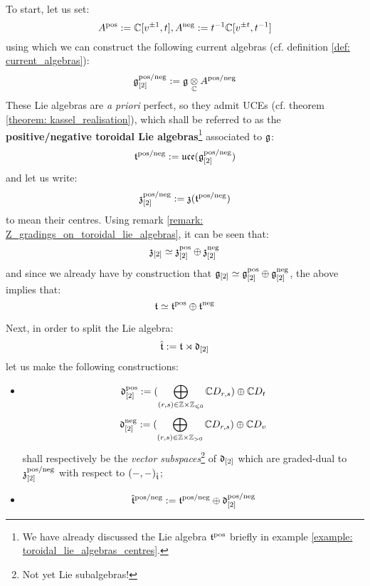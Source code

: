         To start, let us set:
            $$A^{\mathrm{pos}} := \mathbb{C}[v^{\pm 1}, t], A^{\mathrm{neg}} := t^{-1} \mathbb{C}[v^{\pm t}, t^{-1}]$$
        using which we can construct the following current algebras (cf. definition \ref{def: current_algebras}):
            $$\g_{[2]}^{\positive/\negative} := \g \tensor_{\bbC} A^{\positive/\negative}$$
        These Lie algebras are \textit{a priori} perfect, so they admit UCEs (cf. theorem \ref{theorem: kassel_realisation}), which shall be referred to as the \textbf{positive/negative toroidal Lie algebras}\footnote{We have already discussed the Lie algebra $\mathfrak{t}^{\mathrm{pos}}$ briefly in example \ref{example: toroidal_lie_algebras_centres}.} associated to $\mathfrak{g}$:
            $$\mathfrak{t}^{\mathrm{pos}/\mathrm{neg}} := \mathfrak{uce}(\mathfrak{g}_{[2]}^{\mathrm{pos}/\mathrm{neg}})$$
        and let us write:
            $$\mathfrak{z}_{[2]}^{\mathrm{pos}/\mathrm{neg}} := \mathfrak{z}(\mathfrak{t}^{\mathrm{pos}/\mathrm{neg}})$$
        to mean their centres. Using remark \ref{remark: Z_gradings_on_toroidal_lie_algebras}, it can be seen that:
            $$\mathfrak{z}_{[2]} \simeq \mathfrak{z}_{[2]}^{\mathrm{pos}} \oplus \mathfrak{z}_{[2]}^{\mathrm{neg}}$$
        and since we already have by construction that $\mathfrak{g}_{[2]} \simeq \mathfrak{g}_{[2]}^{\mathrm{pos}} \oplus \mathfrak{g}_{[2]}^{\mathrm{neg}}$, the above implies that:
            $$\mathfrak{t} \simeq \mathfrak{t}^{\mathrm{pos}} \oplus \mathfrak{t}^{\mathrm{neg}}$$
        
        Next, in order to split the Lie algebra:
            $$\hat{\mathfrak{t}} := \mathfrak{t} \rtimes \mathfrak{d}_{[2]}$$
        let us make the following constructions:
        \begin{itemize}
            \item
                $$\d_{[2]}^{\positive} := ( \bigoplus_{(r, s) \in \Z \x \Z_{\leq 0} } \bbC D_{r, s} ) \oplus \bbC D_t$$
                $$\d_{[2]}^{\negative} := ( \bigoplus_{(r, s) \in \Z \x \Z_{> 0} } \bbC D_{r, s} ) \oplus \bbC D_v$$
            shall respectively be the \textit{vector subspaces}\footnote{Not yet Lie subalgebras!} of $\mathfrak{d}_{[2]}$ which are graded-dual to $\mathfrak{z}_{[2]}^{\mathrm{pos}/\mathrm{neg}}$ with respect to $(-, -)_{\hat{\mathfrak{t}}}$;
            \item
                $$\hat{\mathfrak{t}}^{\mathrm{pos}/\mathrm{neg}} := \mathfrak{t}^{\mathrm{pos}/\mathrm{neg}} \oplus \mathfrak{d}_{[2]}^{\mathrm{pos}/\mathrm{neg}}$$
        \end{itemize}

